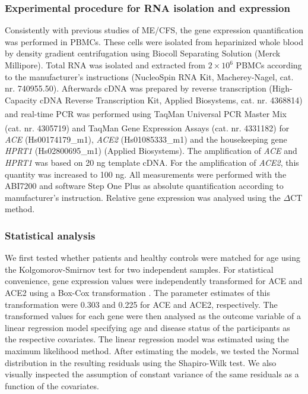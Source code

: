 \subsubsection{Experimental procedure for RNA isolation and expression}

Consistently with previous studies of ME/CFS, the gene expression quantification was performed in PBMCs. These cells were isolated from heparinized whole blood by density gradient centrifugation using Biocoll Separating Solution (Merck Millipore). Total RNA was isolated and extracted from $2\times10^6$ PBMCs according to the manufacturer's instructions (NucleoSpin RNA Kit, Macherey-Nagel, cat. nr. 740955.50). Afterwards cDNA was prepared by reverse transcription (High-Capacity cDNA Reverse Transcription Kit, Applied Biosystems, cat. nr. 4368814) and real-time PCR was performed using TaqMan\textsuperscript{\texttrademark} Universal PCR Master Mix (cat. nr. 4305719) and TaqMan\textsuperscript{\texttrademark} Gene Expression Assays (cat. nr. 4331182) for \textit{ACE} (Hs00174179\_m1), \textit{ACE2} (Hs01085333\_m1) and the housekeeping gene \textit{HPRT1} (Hs02800695\_m1) (Applied Biosystems). The amplification of \textit{ACE} and \textit{HPRT1} was based on 20 ng template cDNA. For the amplification of \textit{ACE2}, this quantity was increased to 100 ng. All measurements were performed with the ABI7200 and software Step One Plus as absolute quantification according to manufacturer's instruction. Relative gene expression was analysed using the ${\Delta}$CT method.

\subsubsection{Statistical analysis}

We first tested whether patients and healthy controls were matched for age using the Kolgomorov-Smirnov test for two independent samples. For statistical convenience, gene expression values were independently transformed for ACE and ACE2 using a Box-Cox transformation \citep{asar2017EstimatingBoxCox}. The parameter estimates of this transformation were 0.303 and 0.225 for ACE and ACE2, respectively. The transformed values for each gene were then analysed as the outcome variable of a linear regression model specifying age and disease status of the participants as the respective covariates. The linear regression model was estimated using the maximum likelihood method. After estimating the models, we tested the Normal distribution in the resulting residuals using the Shapiro-Wilk test. We also visually inspected the assumption of constant variance of the same residuals as a function of the covariates.

